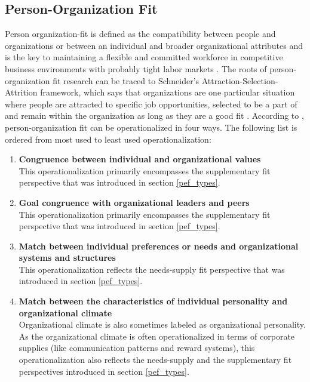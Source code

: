 \documentclass[draft,final]{thesisclass} %
\begin{document}
\subsection{Person-Organization Fit}
Person organization-fit is defined as the compatibility between people and organizations or between an individual and broader organizational attributes and is the key to maintaining a flexible and committed workforce in competitive business environments with probably tight labor markets \parencite[182]{po_and_pj_fit_literature_review}.
The roots of person-organization fit research can be traced to Schneider's Attraction-Selection-Attrition framework, which says that organizations are one particular situation where people are attracted to specific job opportunities, selected to be a part of and remain within the organization as long as they are a good fit \parencite[182]{po_and_pj_fit_literature_review}.
According to \textcite[182]{po_and_pj_fit_literature_review}, person-organization fit can be operationalized in four ways. The following list is ordered from most used to least used operationalization:
\begin{enumerate}
    \item \textbf{Congruence between individual and organizational values}\\
    This operationalization primarily encompasses the supplementary fit perspective that was introduced in section \ref{pef_types}.
    \item \textbf{Goal congruence with organizational leaders and peers}\\
    This operationalization primarily encompasses the supplementary fit perspective that was introduced in section \ref{pef_types}.
    \item \textbf{Match between individual preferences or needs and organizational systems and structures}\\
    This operationalization reflects the needs-supply fit perspective that was introduced in section \ref{pef_types}.
    \item \textbf{Match between the characteristics of individual personality and organizational climate}\\
    Organizational climate is also sometimes labeled as organizational personality.
    As the organizational climate is often operationalized in terms of corporate supplies (like communication patterns and reward systems), this operationalization also reflects the needs-supply and the supplementary fit perspectives introduced in section \ref{pef_types}.
\end{enumerate}
\end{document}
